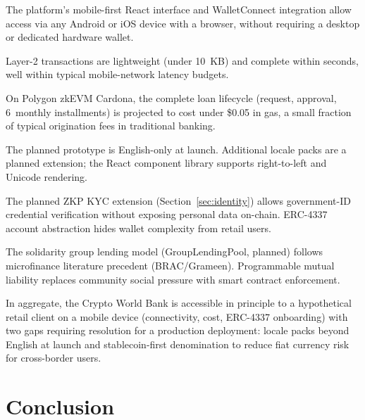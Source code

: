 \documentclass[12pt, a4paper]{report}
\begin{document}
\begin{description}[leftmargin=0pt]

\item[\textbf{1. Device access.}] The platform's mobile-first React interface and WalletConnect integration allow access via any Android or iOS device with a browser, without requiring a desktop or dedicated hardware wallet.

\item[\textbf{2. Connectivity.}] Layer-2 transactions are lightweight (under 10~KB) and complete within seconds, well within typical mobile-network latency budgets.

\item[\textbf{3. Transaction cost.}] On Polygon zkEVM Cardona, the complete loan lifecycle (request, approval, 6~monthly installments) is projected to cost under \$0.05 in gas, a small fraction of typical origination fees in traditional banking.

\item[\textbf{4. Language and literacy.}] The planned prototype is English-only at launch. Additional locale packs are a planned extension; the React component library supports right-to-left and Unicode rendering.

\item[\textbf{5. Identity and onboarding.}] The planned ZKP KYC extension (Section~\ref{sec:identity}) allows government-ID credential verification without exposing personal data on-chain. ERC-4337 account abstraction hides wallet complexity from retail users.

\item[\textbf{6. Group lending fit.}] The solidarity group lending model (GroupLendingPool, planned) follows microfinance literature precedent (BRAC/Grameen). Programmable mutual liability replaces community social pressure with smart contract enforcement.

\end{description}

In aggregate, the Crypto World Bank is accessible in principle to a hypothetical retail client on a mobile device (connectivity, cost, ERC-4337 onboarding) with two gaps requiring resolution for a production deployment: locale packs beyond English at launch and stablecoin-first denomination to reduce fiat currency risk for cross-border users.

\chapter{Conclusion}
\end{document}
